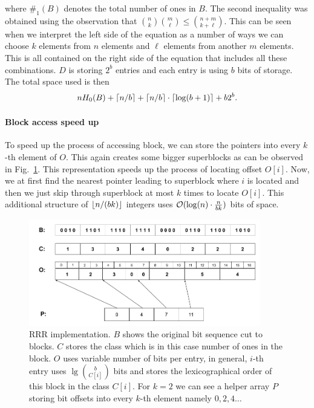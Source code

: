 where $\#_1(B)$ denotes the total number of ones in $B$. The second inequality was obtained using
the observation that ${n\choose k} {m\choose \ell} \leq {n+m\choose k+\ell}$. This can be seen
when we interpret the left side of the equation as a number of ways we can choose $k$ elements
from $n$ elements and $\ell$ elements from another $m$ elements. This is all contained on the
right side of the equation that includes all these combinations. $D$ is storing $2^b$ entries
and each entry is using $b$ bits of storage. The total space used is then
$$nH_0(B) + \left\lceil n/b \right\rceil + \left\lceil n/b \right\rceil \cdot \left\lceil \log(b+1) \right\rceil + b2^b.$$

\paragraph{Block access speed up}

To speed up the process of accessing block, we can store the pointers into every $k$-th element
of $O$. This again creates some bigger superblocks as can be observed in Fig.~\ref{obr:RRRFinal}.
This representation speeds up the process of locating offset $O[i]$. Now, we at first find the
nearest pointer leading to superblock where $i$ is located and then we just skip through superblock
at most $k$ times to locate $O[i]$. This additional structure of $\left\lfloor n/(bk) \right\rfloor$ integers uses
$\mathcal{O}(\log(n)\cdot \frac{n}{bk})$ bits of space.

\begin{figure}
	\centerline{
		\includegraphics[width=0.9\textwidth, height=0.3\textheight]{images/rrr}
	}
	\caption[TODO]{RRR implementation. $B$ shows the original bit sequence cut to
    blocks. $C$ stores the class which is in this case number of ones in the block.
    $O$ uses variable number of bits per entry, in general, $i$-th entry uses
    $\lg {b\choose C[i]}$ bits and stores the lexicographical order
    of this block in the class $C[i]$. For $k=2$ we can see a helper array $P$
    storing bit offsets into every $k$-th element namely $0, 2, 4\ldots$
	}
	\label{obr:RRRFinal}
\end{figure}

